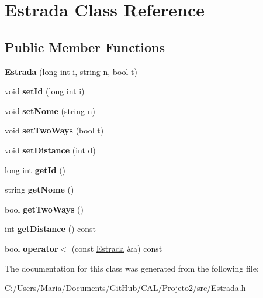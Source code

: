 \hypertarget{class_estrada}{}\section{Estrada Class Reference}
\label{class_estrada}
\subsection*{Public Member Functions}
\begin{DoxyCompactItemize}
\item 
\hypertarget{class_estrada_af2591cdf65861e697496f8cfd6902bc4}{}\label{class_estrada_af2591cdf65861e697496f8cfd6902bc4} 
{\bfseries Estrada} (long int i, string n, bool t)
\item 
\hypertarget{class_estrada_a7a9784c7ec0179de1835ac9d11905654}{}\label{class_estrada_a7a9784c7ec0179de1835ac9d11905654} 
void {\bfseries set\+Id} (long int i)
\item 
\hypertarget{class_estrada_af54c4c047302eebd6a10e15e17cdf819}{}\label{class_estrada_af54c4c047302eebd6a10e15e17cdf819} 
void {\bfseries set\+Nome} (string n)
\item 
\hypertarget{class_estrada_a9b0674665f843f1d92f2aa96c27399e6}{}\label{class_estrada_a9b0674665f843f1d92f2aa96c27399e6} 
void {\bfseries set\+Two\+Ways} (bool t)
\item 
\hypertarget{class_estrada_a1c9cd10a6c8d68c28fb59934ba6ceafb}{}\label{class_estrada_a1c9cd10a6c8d68c28fb59934ba6ceafb} 
void {\bfseries set\+Distance} (int d)
\item 
\hypertarget{class_estrada_ad75540cf60d6da058c8dcbda00da71d6}{}\label{class_estrada_ad75540cf60d6da058c8dcbda00da71d6} 
long int {\bfseries get\+Id} ()
\item 
\hypertarget{class_estrada_a27f3aabb33557cef97b83e4cf346350a}{}\label{class_estrada_a27f3aabb33557cef97b83e4cf346350a} 
string {\bfseries get\+Nome} ()
\item 
\hypertarget{class_estrada_a6a9b86f891ba285256475babb902049e}{}\label{class_estrada_a6a9b86f891ba285256475babb902049e} 
bool {\bfseries get\+Two\+Ways} ()
\item 
\hypertarget{class_estrada_a105d9c0146d7bbe567342a494a9aa04d}{}\label{class_estrada_a105d9c0146d7bbe567342a494a9aa04d} 
int {\bfseries get\+Distance} () const
\item 
\hypertarget{class_estrada_a42f0eb7ce5bd67f3f99929d2809f0dff}{}\label{class_estrada_a42f0eb7ce5bd67f3f99929d2809f0dff} 
bool {\bfseries operator$<$} (const \hyperlink{class_estrada}{Estrada} \&a) const
\end{DoxyCompactItemize}


The documentation for this class was generated from the following file\+:\begin{DoxyCompactItemize}
\item 
C\+:/\+Users/\+Maria/\+Documents/\+Git\+Hub/\+C\+A\+L/\+Projeto2/src/Estrada.\+h\end{DoxyCompactItemize}
